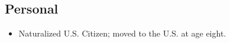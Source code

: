 \documentclass[margin]{res}
\def\tightlist{}
\begin{document}
\begin{resume}
\section{Personal}\label{personal}

\begin{itemize}
\tightlist
\item
  Naturalized U.S. Citizen; moved to the U.S. at age eight.
\end{itemize}

\end{resume}
\end{document}
